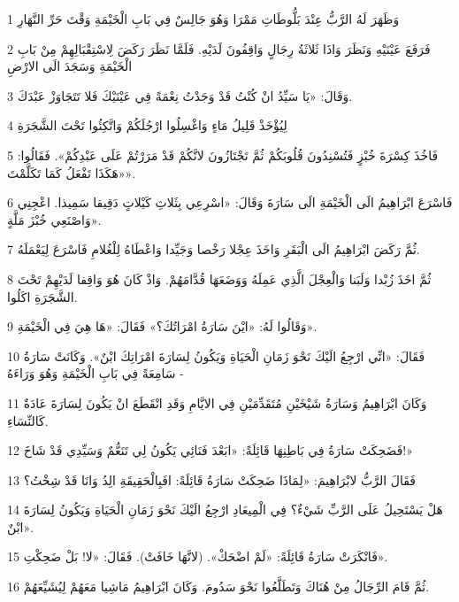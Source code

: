 \par 1 وَظَهَرَ لَهُ الرَّبُّ عِنْدَ بَلُّوطَاتِ مَمْرَا وَهُوَ جَالِسٌ فِي بَابِ الْخَيْمَةِ وَقْتَ حَرِّ النَّهَارِ
\par 2 فَرَفَعَ عَيْنَيْهِ وَنَظَرَ وَاذَا ثَلاثَةُ رِجَالٍ وَاقِفُونَ لَدَيْهِ. فَلَمَّا نَظَرَ رَكَضَ لِاسْتِقْبَالِهِمْ مِنْ بَابِ الْخَيْمَةِ وَسَجَدَ الَى الارْضِ
\par 3 وَقَالَ: «يَا سَيِّدُ انْ كُنْتُ قَدْ وَجَدْتُ نِعْمَةً فِي عَيْنَيْكَ فَلا تَتَجَاوَزْ عَبْدَكَ.
\par 4 لِيُؤْخَذْ قَلِيلُ مَاءٍ وَاغْسِلُوا ارْجُلَكُمْ وَاتَّكِئُوا تَحْتَ الشَّجَرَةِ
\par 5 فَاخُذَ كِسْرَةَ خُبْزٍ فَتُسْنِدُونَ قُلُوبَكُمْ ثُمَّ تَجْتَازُونَ لانَّكُمْ قَدْ مَرَرْتُمْ عَلَى عَبْدِكُمْ». فَقَالُوا: «هَكَذَا تَفْعَلُ كَمَا تَكَلَّمْتَ».
\par 6 فَاسْرَعَ ابْرَاهِيمُ الَى الْخَيْمَةِ الَى سَارَةَ وَقَالَ: «اسْرِعِي بِثَلاثِ كَيْلاتٍ دَقِيقا سَمِيذا. اعْجِنِي وَاصْنَعِي خُبْزَ مَلَّةٍ».
\par 7 ثُمَّ رَكَضَ ابْرَاهِيمُ الَى الْبَقَرِ وَاخَذَ عِجْلا رَخْصا وَجَيِّدا وَاعْطَاهُ لِلْغُلامِ فَاسْرَعَ لِيَعْمَلَهُ.
\par 8 ثُمَّ اخَذَ زُبْدا وَلَبَنا وَالْعِجْلَ الَّذِي عَمِلَهُ وَوَضَعَهَا قُدَّامَهُمْ. وَاذْ كَانَ هُوَ وَاقِفا لَدَيْهِمْ تَحْتَ الشَّجَرَةِ اكَلُوا.
\par 9 وَقَالُوا لَهُ: «ايْنَ سَارَةُ امْرَاتُكَ؟» فَقَالَ: «هَا هِيَ فِي الْخَيْمَةِ».
\par 10 فَقَالَ: «انِّي ارْجِعُ الَيْكَ نَحْوَ زَمَانِ الْحَيَاةِ وَيَكُونُ لِسَارَةَ امْرَاتِكَ ابْنٌ». وَكَانَتْ سَارَةُ سَامِعَةً فِي بَابِ الْخَيْمَةِ وَهُوَ وَرَاءَهُ -
\par 11 وَكَانَ ابْرَاهِيمُ وَسَارَةُ شَيْخَيْنِ مُتَقَدِّمَيْنِ فِي الايَّامِ وَقَدِ انْقَطَعَ انْ يَكُونَ لِسَارَةَ عَادَةٌ كَالنِّسَاءِ.
\par 12 فَضَحِكَتْ سَارَةُ فِي بَاطِنِهَا قَائِلَةً: «ابَعْدَ فَنَائِي يَكُونُ لِي تَنَعُّمٌ وَسَيِّدِي قَدْ شَاخَ!»
\par 13 فَقَالَ الرَّبُّ لابْرَاهِيمَ: «لِمَاذَا ضَحِكَتْ سَارَةُ قَائِلَةً: افَبِالْحَقِيقَةِ الِدُ وَانَا قَدْ شِخْتُ؟
\par 14 هَلْ يَسْتَحِيلُ عَلَى الرَّبِّ شَيْءٌ؟ فِي الْمِيعَادِ ارْجِعُ الَيْكَ نَحْوَ زَمَانِ الْحَيَاةِ وَيَكُونُ لِسَارَةَ ابْنٌ».
\par 15 فَانْكَرَتْ سَارَةُ قَائِلَةً: «لَمْ اضْحَكْ». (لانَّهَا خَافَتْ). فَقَالَ: «لا! بَلْ ضَحِكْتِ».
\par 16 ثُمَّ قَامَ الرِّجَالُ مِنْ هُنَاكَ وَتَطَلَّعُوا نَحْوَ سَدُومَ. وَكَانَ ابْرَاهِيمُ مَاشِيا مَعَهُمْ لِيُشَيِّعَهُمْ.

